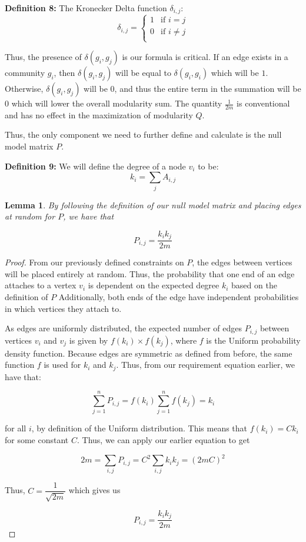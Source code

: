 \documentclass{article}
\newtheorem{lemma}[theorem]{Lemma}
\begin{document}
\bigskip

\textbf{Definition 8:} The Kronecker Delta function $\delta_{i, j}$:  
\[   
\delta_{i,j} = 
     \begin{cases}
       1 & \text{if } i = j \\
       0 & \text{if } i \neq j \\
     \end{cases}
\]

Thus, the presence of $\delta (g_i, g_j)$ is our formula is critical.
If an edge exists in a community $g_i$, then $\delta (g_i, g_j)$ will be equal to $\delta (g_i, g_i)$ which will be $1$.
Otherwise, $\delta (g_i, g_j)$ will be $0$, and thus the entire term in the summation will be $0$ which will lower the overall modularity sum.
The quantity $\frac{1}{2m}$ is conventional and has no effect in the maximization of modularity $Q$.

\bigskip

\noindent Thus, the only component we need to further define and calculate is the null model matrix $P$.

\bigskip 

\textbf{Definition 9:} We will define the degree of a node $v_i$ to be:  
$$ k_{i} = \sum_j A_{i,j} $$

\bigskip

\begin{lemma}
By following the definition of our null model matrix and placing edges at random for $P$, we have that 

$$ P_{i,j} = \dfrac{k_i k_j}{2m} $$

\end{lemma}

\begin{proof}

From our previously defined constraints on $P$, the edges between vertices will be placed entirely at random.
Thus, the probability that one end of an edge attaches to a vertex $v_i$ is dependent on the expected degree $k_i$ based on the definition of $P$
Additionally, both ends of the edge have independent probabilities in which vertices they attach to.

As edges are uniformly distributed, the expected number of edges $P_{i,j}$ between vertices $v_i$ and $v_j$ is given by $f(k_i) \times f(k_j)$, where $f$ is the Uniform probability density function.
Because edges are symmetric as defined from before, the same function $f$ is used for $k_i$ and $k_j$. 
Thus, from our requirement equation earlier, we have that:

$$ \sum_{j = 1}^{n} P_{i,j} = f(k_i) \sum_{j = 1}^{n} f(k_j) = k_i $$

for all $i$, by definition of the Uniform distribution. 
This means that $f(k_i) = C k_i$ for some constant $C$. Thus, we can apply our earlier equation to get

$$ 2m = \sum_{i, j} P_{i,j} = C^2 \sum_{i, j} k_i k_j = (2mC)^2$$

Thus, $C = \dfrac{1}{\sqrt{2m}}$ which gives us 

$$ P_{i,j} = \dfrac{k_i k_j}{2m} $$

\end{proof}
\end{document}
